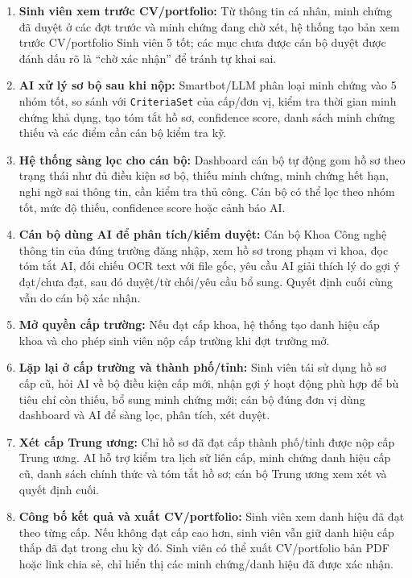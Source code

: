 \begin{enumerate}
    \item \textbf{Sinh viên xem trước CV/portfolio:} Từ thông tin cá nhân, minh chứng đã duyệt ở các đợt trước và minh chứng đang chờ xét, hệ thống tạo bản xem trước CV/portfolio Sinh viên 5 tốt; các mục chưa được cán bộ duyệt được đánh dấu rõ là ``chờ xác nhận'' để tránh tự khai sai.

    \item \textbf{AI xử lý sơ bộ sau khi nộp:} Smartbot/LLM phân loại minh chứng vào 5 nhóm tốt, so sánh với \texttt{CriteriaSet} của cấp/đơn vị, kiểm tra thời gian minh chứng khả dụng, tạo tóm tắt hồ sơ, confidence score, danh sách minh chứng thiếu và các điểm cần cán bộ kiểm tra kỹ.

    \item \textbf{Hệ thống sàng lọc cho cán bộ:} Dashboard cán bộ tự động gom hồ sơ theo trạng thái như đủ điều kiện sơ bộ, thiếu minh chứng, minh chứng hết hạn, nghi ngờ sai thông tin, cần kiểm tra thủ công. Cán bộ có thể lọc theo nhóm tốt, mức độ thiếu, confidence score hoặc cảnh báo AI.

    \item \textbf{Cán bộ dùng AI để phân tích/kiểm duyệt:} Cán bộ Khoa Công nghệ thông tin của đúng trường đăng nhập, xem hồ sơ trong phạm vi khoa, đọc tóm tắt AI, đối chiếu OCR text với file gốc, yêu cầu AI giải thích lý do gợi ý đạt/chưa đạt, sau đó duyệt/từ chối/yêu cầu bổ sung. Quyết định cuối cùng vẫn do cán bộ xác nhận.

    \item \textbf{Mở quyền cấp trường:} Nếu đạt cấp khoa, hệ thống tạo danh hiệu cấp khoa và cho phép sinh viên nộp cấp trường khi đợt trường mở.

    \item \textbf{Lặp lại ở cấp trường và thành phố/tỉnh:} Sinh viên tái sử dụng hồ sơ cấp cũ, hỏi AI về bộ điều kiện cấp mới, nhận gợi ý hoạt động phù hợp để bù tiêu chí còn thiếu, bổ sung minh chứng mới; cán bộ đúng đơn vị dùng dashboard và AI để sàng lọc, phân tích, xét duyệt.

    \item \textbf{Xét cấp Trung ương:} Chỉ hồ sơ đã đạt cấp thành phố/tỉnh được nộp cấp Trung ương. AI hỗ trợ kiểm tra lịch sử liên cấp, minh chứng danh hiệu cấp cũ, danh sách chính thức và tóm tắt hồ sơ; cán bộ Trung ương xem xét và quyết định cuối.

    \item \textbf{Công bố kết quả và xuất CV/portfolio:} Sinh viên xem danh hiệu đã đạt theo từng cấp. Nếu không đạt cấp cao hơn, sinh viên vẫn giữ danh hiệu cấp thấp đã đạt trong chu kỳ đó. Sinh viên có thể xuất CV/portfolio bản PDF hoặc link chia sẻ, chỉ hiển thị các minh chứng/danh hiệu đã được xác nhận.
\end{enumerate}


